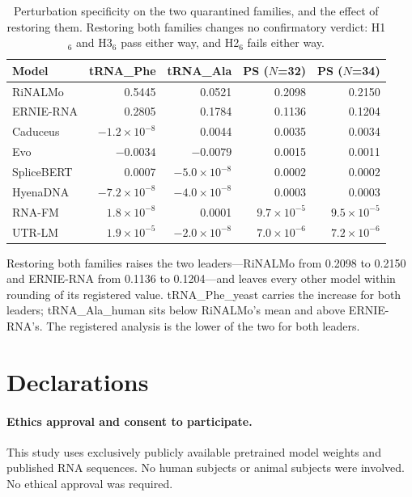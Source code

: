 \documentclass[11pt]{article}
\begin{document}
\begin{table}[htbp]
\centering
\caption{Perturbation specificity on the two quarantined families, and the
effect of restoring them. Restoring both families changes no confirmatory
verdict: H1$_6$ and H3$_6$ pass either way, and H2$_6$ fails either way.}
\label{tab:quarantine}
\small
\begin{tabular}{lrrrr}
\toprule
\textbf{Model} & \textbf{tRNA\_Phe} & \textbf{tRNA\_Ala} & \textbf{PS ($N$=32)} & \textbf{PS ($N$=34)} \\
\midrule
RiNALMo                    & 0.5445 & 0.0521 & 0.2098 & 0.2150 \\
ERNIE-RNA                  & 0.2805 & 0.1784 & 0.1136 & 0.1204 \\
Caduceus                   & $-1.2 \times 10^{-8}$ & 0.0044 & 0.0035 & 0.0034 \\
Evo                        & $-0.0034$ & $-0.0079$ & 0.0015 & 0.0011 \\
SpliceBERT                 & 0.0007 & $-5.0 \times 10^{-8}$ & 0.0002 & 0.0002 \\
HyenaDNA                   & $-7.2 \times 10^{-8}$ & $-4.0 \times 10^{-8}$ & 0.0003 & 0.0003 \\
RNA-FM                     & $1.8 \times 10^{-8}$ & 0.0001 & $9.7 \times 10^{-5}$ & $9.5 \times 10^{-5}$ \\
UTR-LM                     & $1.9 \times 10^{-5}$ & $-2.0 \times 10^{-8}$ & $7.0 \times 10^{-6}$ & $7.2 \times 10^{-6}$ \\
\bottomrule
\end{tabular}
\end{table}

Restoring both families raises the two leaders---RiNALMo from 0.2098 to 0.2150
and ERNIE-RNA from 0.1136 to 0.1204---and leaves every other model within
rounding of its registered value. tRNA\_Phe\_yeast carries the increase for both
leaders; tRNA\_Ala\_human sits below RiNALMo's mean and above ERNIE-RNA's. The
registered analysis is the lower of the two for both leaders.

\section*{Declarations}

\paragraph{Ethics approval and consent to participate.}
This study uses exclusively publicly available pretrained model weights
and published RNA sequences. No human subjects or animal subjects were
involved. No ethical approval was required.
\end{document}
